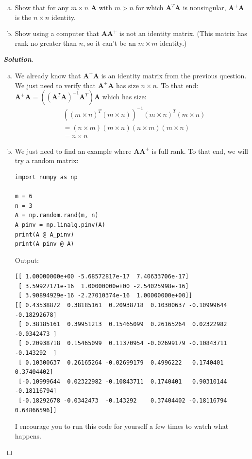 \documentclass[11pt]{article}
\renewcommand{\vec}[1]{\mathbf{#1}}
\newenvironment{problem}[2][Question]{\begin{trivlist}
\item[\hskip \labelsep {\bfseries #1}\hskip \labelsep {\bfseries #2.}]}{\end{trivlist}}
\newenvironment{solution}{%
  \begin{proof}[\textbf{Solution}]$ $\par\nobreak\ignorespaces
}{%
  \end{proof}
}
\theoremstyle{definition}
\begin{document}
\begin{problem}{3.2.5}
\begin{enumerate}[(a)]
    \item Show that for any $m \times n$ $\vec{A}$ with $m > n$ for which $\vec{A}^T\vec{A}$ is nonsingular, $\vec{A}^+\vec{A}$ is the $n \times n$ identity.
    \item Show using a computer that $\vec{A}\vec{A}^+$ is not an identity matrix. (This matrix has rank no greater than $n$, so it can't be an $m \times m$ identity.)
\end{enumerate}
\end{problem}
\begin{solution}
\begin{enumerate}[(a)]
    \item We already know that $\vec{A}^+\vec{A}$ is an identity matrix from the previous question. We just need to verify that $\vec{A}^+\vec{A}$ has size $n \times n$. To that end: $\vec{A}^+\vec{A} = ((\vec{A}^T\vec{A})^{-1}\vec{A}^T)\vec{A}$ which has size:
    \begin{align*}
        &((m \times n)^T(m \times n))^{-1}(m \times n)^T(m\times n) \\
        &= (n \times m)(m \times n)(n \times m)(m\times n) \\
        &= n \times n
    \end{align*}
    \item We just need to find an example where $\vec{A}\vec{A}^+$ is full rank. To that end, we will try a random matrix:
\begin{lstlisting}[frame=tlrb]
import numpy as np

m = 6
n = 3
A = np.random.rand(m, n)
A_pinv = np.linalg.pinv(A)
print(A @ A_pinv)
print(A_pinv @ A)
\end{lstlisting}
Output:
\begin{verbatim}
[[ 1.00000000e+00 -5.68572817e-17  7.40633706e-17]
 [ 3.59927171e-16  1.00000000e+00 -2.54025998e-16]
 [ 3.90894929e-16 -2.27010374e-16  1.00000000e+00]]
[[ 0.43538872  0.38185161  0.20938718  0.10300637 -0.10999644 -0.18292678]
 [ 0.38185161  0.39951213  0.15465099  0.26165264  0.02322982 -0.0342473 ]
 [ 0.20938718  0.15465099  0.11370954 -0.02699179 -0.10843711 -0.143292  ]
 [ 0.10300637  0.26165264 -0.02699179  0.4996222   0.1740401   0.37404402]
 [-0.10999644  0.02322982 -0.10843711  0.1740401   0.90310144 -0.18116794]
 [-0.18292678 -0.0342473  -0.143292    0.37404402 -0.18116794  0.64866596]]
\end{verbatim}
I encourage you to run this code for yourself a few times to watch what happens.
\end{enumerate}
\end{solution}
\end{document}
